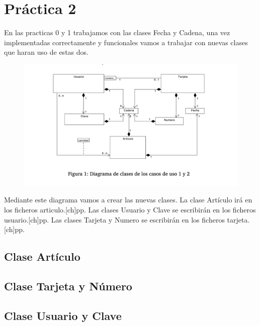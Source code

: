\chapter{Práctica 2}
En las practicas 0 y 1 trabajamos con las clases Fecha y Cadena, una vez implementadas correctamente
y funcionales vamos a trabajar con nuevas clases que haran uso de estas dos.

\begin{figure}[h]
    \begin{center}
        \includegraphics[width=\textwidth]{Pics/P2_1.png}
    \end{center}
\end{figure}
Mediante este diagrama vamos a crear las nuevas clases.
La clase Artículo irá en los ficheros articulo.[ch]pp. Las clases Usuario y Clave se 
escribirán en los ficheros usuario.[ch]pp. Las clases Tarjeta y Numero se escribirán en los 
ficheros tarjeta.[ch]pp.

\section{Clase Artículo}
    
\section{Clase Tarjeta y Número}
    
\newpage
\section{Clase Usuario y Clave}
    


